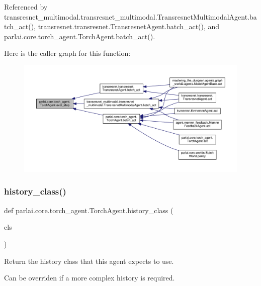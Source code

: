 Referenced by transresnet\+\_\+multimodal.\+transresnet\+\_\+multimodal.\+Transresnet\+Multimodal\+Agent.\+batch\+\_\+act(), transresnet.\+transresnet.\+Transresnet\+Agent.\+batch\+\_\+act(), and parlai.\+core.\+torch\+\_\+agent.\+Torch\+Agent.\+batch\+\_\+act().

Here is the caller graph for this function\+:
\nopagebreak
\begin{figure}[H]
\begin{center}
\leavevmode
\includegraphics[width=350pt]{classparlai_1_1core_1_1torch__agent_1_1TorchAgent_a18de0a52aeec4ef721aedbdd6ac06cad_icgraph}
\end{center}
\end{figure}
\mbox{\label{classparlai_1_1core_1_1torch__agent_1_1TorchAgent_a0bd9118252c602bb9d5a596ecae16717}} 
\subsubsection{\texorpdfstring{history\+\_\+class()}{history\_class()}}
{\footnotesize\ttfamily def parlai.\+core.\+torch\+\_\+agent.\+Torch\+Agent.\+history\+\_\+class (\begin{DoxyParamCaption}\item[{}]{cls }\end{DoxyParamCaption})}

\begin{DoxyVerb}Return the history class that this agent expects to use.

Can be overriden if a more complex history is required.
\end{DoxyVerb}
 

